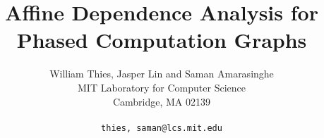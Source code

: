 \documentclass[10pt]{article}
\title{Affine Dependence Analysis for Phased Computation Graphs}
\author{William Thies, Jasper Lin and Saman Amarasinghe \\
  MIT Laboratory for Computer Science\\
  Cambridge, MA  02139\\ \\
  \texttt{\symbol{`\{}thies, saman\symbol{`\}}@lcs.mit.edu}}
\date{}
\begin{document}
  \maketitle

  \newcommand{\mt}[1]{\mbox{\it #1}}
  \newcommand{\todo}[1]{\framebox{#1}}
  \newcommand{\dep}[0]{Dependence Frontier}                %
  \newcommand{\DP}[0]{\textsc{Frontier}}                   %
  \newcommand{\DEP}[2]{\DP_{#1 \small{\rightarrow} #2}}    %

  \begin{abstract}
    
  \end{abstract}

  
  
  
  
  
  
  
  

  \begin{small}
    \begin{singlespace}
      
      
    \end{singlespace}
  \end{small}

  
  
\end{document}
